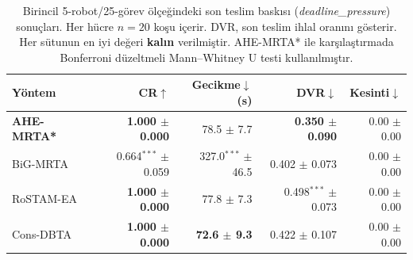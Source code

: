 \begin{table}[t]
\centering
\caption{Birincil 5-robot/25-görev ölçeğindeki son teslim baskısı
(\textit{deadline\_pressure}) sonuçları. Her hücre $n{=}20$ koşu içerir. DVR,
son teslim ihlal oranını gösterir. Her sütunun en iyi değeri \textbf{kalın}
verilmiştir. AHE-MRTA* ile karşılaştırmada Bonferroni düzeltmeli
Mann--Whitney U testi kullanılmıştır.}
\label{tab:deadline}
\small
\setlength{\tabcolsep}{3pt}
\begin{tabular}{lrrrr}
\toprule
\textbf{Yöntem} & \textbf{CR$\uparrow$} & \textbf{Gecikme$\downarrow$(s)} & \textbf{DVR$\downarrow$} & \textbf{Kesinti$\downarrow$} \\
\midrule
\textbf{AHE-MRTA*} & \textbf{1.000 $\pm$ 0.000} & 78.5 $\pm$ 7.7 & \textbf{0.350 $\pm$ 0.090} & 0.00 $\pm$ 0.00 \\
BiG-MRTA & 0.664$^{***}$ $\pm$ 0.059 & 327.0$^{***}$ $\pm$ 46.5 & 0.402 $\pm$ 0.073 & 0.00 $\pm$ 0.00 \\
RoSTAM-EA & \textbf{1.000 $\pm$ 0.000} & 77.8 $\pm$ 7.3 & 0.498$^{***}$ $\pm$ 0.073 & 0.00 $\pm$ 0.00 \\
Cons-DBTA & \textbf{1.000 $\pm$ 0.000} & \textbf{72.6 $\pm$ 9.3} & 0.422 $\pm$ 0.107 & 0.00 $\pm$ 0.00 \\
\bottomrule
\end{tabular}
\end{table}
